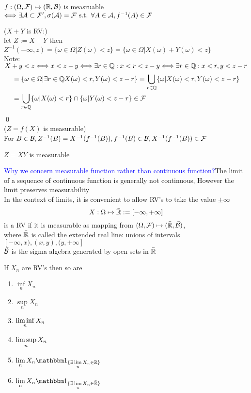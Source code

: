 \begin{rem}
$f: (\Omega, \mathcal{F}) \mapsto (\mathbb{R}, \mathcal{B})$ is measruable $\Longleftrightarrow \exists \mathcal{A}\subset \mathcal{F}', \sigma(\mathcal{A}) = \mathcal{F} \text{ s.t. } \forall A\in \mathcal{A}, f^{-1}(A) \in \mathcal{F}$
\end{rem}
\pf ($X+Y$ is RV:) \\
let $Z := X + Y$ then $Z^{-1}(-\infty, z) = \{\omega \in \Omega| Z(\omega) < z\} = \{\omega \in \Omega| X(\omega)+ Y(\omega)< z\}$ \\[0.5cm]
Note: $X + y < z \Longleftrightarrow x<z-y \Longleftrightarrow \exists r\in \mathbb{Q}: x<r<z-y \Longleftrightarrow \exists r\in \mathbb{Q}: x<r, y<z-r$
\begin{align*}
   &=\{\omega \in \Omega| \exists r\in \mathbb{Q} X(\omega)<r,  Y(\omega)< z-r\} = \bigcup\limits_{r \in \mathbb{Q}}\{\omega| X(\omega)<r,  Y(\omega)< z-r\} \\
   &= \bigcup\limits_{r \in \mathbb{Q}}\{\omega| X(\omega)<r\}\cap\{\omega|  Y(\omega)< z-r\} \in \mathcal{F}
\end{align*}
\qed \\
($Z = f(X)$ is measurable) \\
For $B\in \mathcal{B}, Z^{-1}(B) = X^{-1}(f^{-1}(B)), f^{-1}(B)\in \mathcal{B}, X^{-1}(f^{-1}(B)) \in \mathcal{F}$
\begin{ex}
$Z = XY$ is measurable
\end{ex}
\newpage
\textcolor{blue}{Why we concern measurable function rather than continuous function?}The limit of a sequence of continuous function is generally not continuous, However the limit preserves measurability \\[0.5cm]
In the context of limits, it is convenient to allow RV's to take the value $\pm\infty$
\begin{equation*}
    X: \Omega \mapsto \bar{\mathbb{R}} := [-\infty, +\infty]
\end{equation*}is a RV if it is measurable as mapping from $ (\Omega, \mathcal{F}) \mapsto (\bar{\mathbb{R}}, \bar{\mathcal{B}})$, \\ 
where $\bar{\mathbb{R}}$ is called the extended real line: unions of intervals $[-\infty,x), (x,y), (y, +\infty]$ \\
$\bar{\mathcal{B}}$ is the sigma algebra generated by open sets in $\bar{\mathbb{R}}$
\begin{prop}
If {$X_n$} are RV's then so are 
\begin{enumerate}
    \item $\inf\limits_{n} X_n$
    \item $\sup\limits_{n} X_n$
    \item $\liminf\limits_{n} X_n$
    \item $\limsup\limits_{n} X_n$
    \item $\lim\limits_{n} X_n \I_{\{\exists \lim\limits_{n} X_n \in \R\}}$
    \item $\lim\limits_{n}X_n \I_{\{\exists \lim\limits_{n} X_n \in \bar{\R}\}}$
\end{enumerate}
\end{prop}
